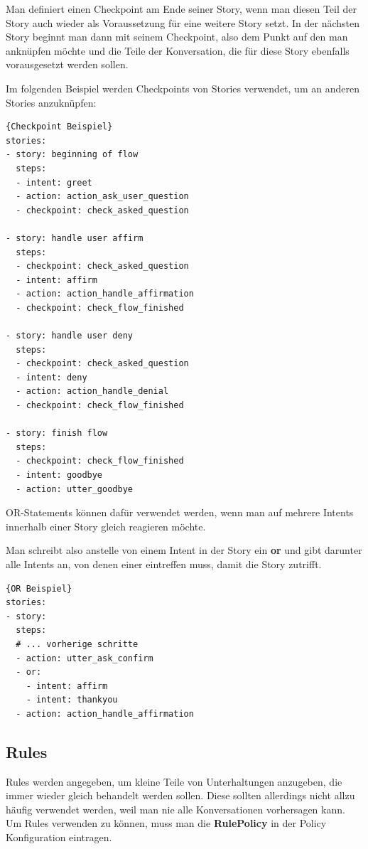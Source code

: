 Man definiert einen Checkpoint am Ende seiner Story, wenn man diesen Teil der Story auch wieder als Voraussetzung für eine weitere Story setzt.
In der nächsten Story beginnt man dann mit seinem Checkpoint, also dem Punkt auf den man anknüpfen möchte und die Teile der Konversation, die für diese Story ebenfalls vorausgesetzt werden sollen.

Im folgenden Beispiel werden Checkpoints von Stories verwendet, um an anderen Stories anzuknüpfen\cite{checkpoints}:

\begin{lstlisting}[label={lst:checkpoints-example},caption={Checkpoints Beispiel}]{Checkpoint Beispiel}
stories:
- story: beginning of flow
  steps:
  - intent: greet
  - action: action_ask_user_question
  - checkpoint: check_asked_question

- story: handle user affirm
  steps:
  - checkpoint: check_asked_question
  - intent: affirm
  - action: action_handle_affirmation
  - checkpoint: check_flow_finished

- story: handle user deny
  steps:
  - checkpoint: check_asked_question
  - intent: deny
  - action: action_handle_denial
  - checkpoint: check_flow_finished

- story: finish flow
  steps:
  - checkpoint: check_flow_finished
  - intent: goodbye
  - action: utter_goodbye
\end{lstlisting}

OR-Statements können dafür verwendet werden, wenn man auf mehrere Intents innerhalb einer Story gleich reagieren möchte.\cite{orStatements}

Man schreibt also anstelle von einem Intent in der Story ein \textbf{or} und gibt darunter alle Intents an, von denen einer eintreffen muss, damit die Story zutrifft.

\begin{lstlisting}[label={lst:or-example},caption={OR Beispiel}]{OR Beispiel}
stories:
- story:
  steps:
  # ... vorherige schritte
  - action: utter_ask_confirm
  - or:
    - intent: affirm
    - intent: thankyou
  - action: action_handle_affirmation
\end{lstlisting}

\subsection{Rules}

Rules werden angegeben, um kleine Teile von Unterhaltungen anzugeben, die immer wieder gleich behandelt werden sollen.
Diese sollten allerdings nicht allzu häufig verwendet werden, weil man nie alle Konversationen vorhersagen kann.
Um Rules verwenden zu können, muss man die \textbf{RulePolicy} in der Policy Konfiguration eintragen.\cite{rules}

